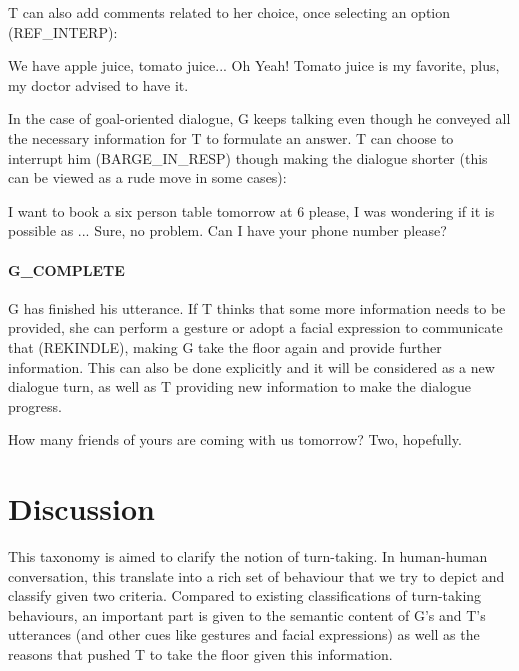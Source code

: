                    	T can also add comments related to her choice, once selecting an option (REF\_INTERP):
                    
                    	\begin{dialogue}
							 We have apple juice, tomato juice...
							 Oh Yeah! Tomato juice is my favorite, plus, my doctor advised to have it.
						\end{dialogue}
                    
                    In the case of goal-oriented dialogue, G keeps talking even though he conveyed all the necessary information for T to formulate an answer. T can choose to interrupt him (BARGE\_IN\_RESP) though making the dialogue shorter (this can be viewed as a rude move in some cases):
                    
                 		\begin{dialogue}
							 I want to book a six person table tomorrow at 6 please, I was wondering if it is possible as ...
							 Sure, no problem. Can I have your phone number please?
						\end{dialogue}
                        
                  	\paragraph{G\_COMPLETE} G has finished his utterance. If T thinks that some more information needs to be provided, she can perform a gesture or adopt a facial expression to communicate that (REKINDLE), making G take the floor again and provide further information. This can also be done explicitly and it will be considered as a new dialogue turn, as well as T providing new information to make the dialogue progress.
                    
                    	\begin{dialogue}
							 How many friends of yours are coming with us tomorrow?
							\speak{T} Two, hopefully.
						\end{dialogue}

\section{Discussion}

	This taxonomy is aimed to clarify the notion of turn-taking. In human-human conversation, this translate into a rich set of behaviour that we try to depict and classify given two criteria. Compared to existing classifications of turn-taking behaviours, an important part is given to the semantic content of G's and T's utterances (and other cues like gestures and facial expressions) as well as the reasons that pushed T to take the floor given this information.
    
